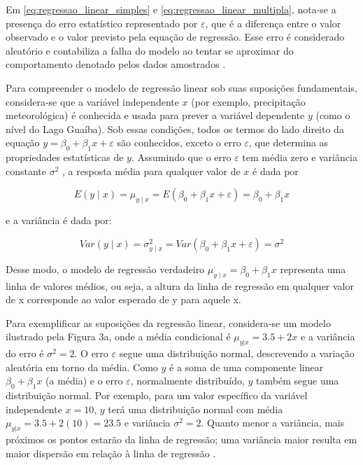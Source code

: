 Em \ref{eq:regressao_linear_simples} e \ref{eq:regressao_linear_multipla}, nota-se a presença do erro estatístico representado por $\varepsilon$, que é a diferença entre o valor observado e o valor previsto pela equação de regressão. Esse erro é considerado aleatório e contabiliza a falha do modelo ao tentar se aproximar do comportamento denotado pelos dados amostrados \cite{montgomery2012}.

Para compreender o modelo de regressão linear sob suas suposições fundamentais, considera-se que a variável independente $ x $ (por exemplo, precipitação meteorológica) é conhecida e usada para prever a variável dependente $ y $ (como o nível do Lago Guaíba). Sob essas condições, todos os termos do lado direito da equação $ y = \beta_0 + \beta_1 x + \varepsilon $ são conhecidos, exceto o erro $ \varepsilon $, que determina as propriedades estatísticas de $ y $. Assumindo que o erro $ \varepsilon $ tem média zero e variância constante $ \sigma^2 $ \cite{montgomery2012}, a resposta média para qualquer valor de $ x $ é dada por

\begin{equation}
	E(y \mid x) = \mu_{y \mid x} = E(\beta_0 + \beta_1x + \varepsilon) = \beta_0 + \beta_1x
\end{equation}

e a variância é dada por:

\begin{equation}
	Var (y \mid x) = \sigma_{y \mid x}^2 = Var(\beta_0 + \beta_1x + \varepsilon) = \sigma^2
\end{equation}

Desse modo, o modelo de regressão verdadeiro $\mu_{y \mid x} = \beta_0 + \beta_1x$ representa uma linha de valores médios, ou seja, a altura da linha de regressão em qualquer valor de x corresponde ao valor esperado de y para aquele x.

Para exemplificar as suposições da regressão linear, considera-se um modelo ilustrado pela Figura 3a, onde a média condicional é $ \mu_{y|x} = 3.5 + 2x $ e a variância do erro é $ \sigma^2 = 2 $. O erro $ \varepsilon $ segue uma distribuição normal, descrevendo a variação aleatória em torno da média. Como $ y $ é a soma de uma componente linear $ \beta_0 + \beta_1 x $ (a média) e o erro $ \varepsilon $, normalmente distribuído, $ y $ também segue uma distribuição normal. Por exemplo, para um valor específico da variável independente $ x = 10 $, $ y $ terá uma distribuição normal com média $ \mu_{y|x} = 3.5 + 2(10) = 23.5 $ e variância $ \sigma^2 = 2 $. Quanto menor a variância, mais próximos os pontos estarão da linha de regressão; uma variância maior resulta em maior dispersão em relação à linha de regressão \cite{montgomery2012}.

